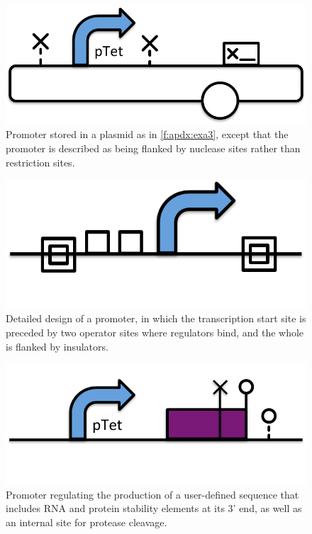 \begin{figure}[h!]
\includegraphics[scale=0.5]{figures/apdx-examples/apdx-exa6.pdf}
\caption{Promoter stored in a plasmid as in \ref{f:apdx:exa3}, except that the promoter is described as being flanked by nuclease sites rather than restriction sites.}
\label{f:apdx:exa6}
\end{figure}

\begin{figure}[h!]
\includegraphics[scale=0.5]{figures/apdx-examples/apdx-exa7.pdf}
\caption{Detailed design of a promoter, in which the transcription start site is preceded by two operator sites where regulators bind, and the whole is flanked by insulators.}
\label{f:apdx:exa7}
\end{figure}

\begin{figure}[h!]
\includegraphics[scale=0.5]{figures/apdx-examples/apdx-exa8.pdf}
\caption{Promoter regulating the production of a user-defined sequence that includes RNA and protein stability elements at its 3' end, as well as an internal site for protease cleavage.}
\label{f:apdx:exa9}
\end{figure}

